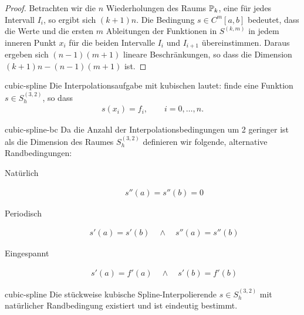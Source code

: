 \begin{proof}
  Betrachten wir die $n$ Wiederholungen des Raums $\P_k$, eine für
  jedes Intervall $I_i$, so ergibt sich $(k+1)n$.  Die Bedingung
  $s\in C^m[a,b]$ bedeutet, dass die Werte und die ersten $m$
  Ableitungen der Funktionen in $S^{(k,m)}$ in jedem inneren Punkt
  $x_i$ für die beiden Intervalle $I_i$ und $I_{i+1}$
  übereinstimmen. Daraus ergeben sich $(n-1)(m+1)$ lineare
  Beschränkungen, so dass die Dimension $(k+1)n - (n-1)(m+1)$ ist.
\end{proof}

\begin{Definition}{cubic-spline}
  Die Interpolationsaufgabe mit kubischen  lautet:
  finde eine Funktion $s\in S_h^{(3,2)}$, so dass
  \begin{gather}
    s(x_i) = f_i,\qquad i=0,\dots,n.
  \end{gather}
\end{Definition}

\begin{Definition}{cubic-spline-bc}
  Da die Anzahl der Interpolationsbedingungen um 2 geringer ist als
  die Dimension des Raumes $S_h^{(3,2)}$ definieren wir folgende,
  alternative Randbedingungen:
  \begin{description}
  \item[Natürlich]
    \begin{gather}
      s''(a) = s''(b) = 0
    \end{gather}
  \item[Periodisch]
    \begin{gather}
      s'(a) = s'(b) \quad \wedge \quad s''(a) = s''(b)
    \end{gather}
  \item[Eingespannt]
    \begin{gather}
      s'(a) = f'(a) \quad \wedge \quad s'(b) = f'(b)
    \end{gather}
  \end{description}
\end{Definition}

\begin{Satz}{cubic-spline}
  Die stückweise kubische Spline-Interpolierende $s\in S_h^{(3,2)}$
  mit natürlicher Randbedingung existiert und ist eindeutig bestimmt.
\end{Satz}

